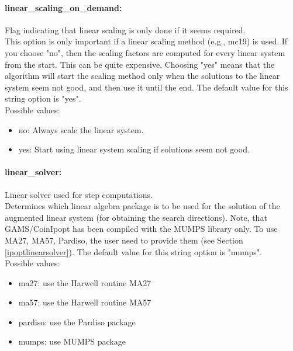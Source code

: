 \paragraph{linear\_scaling\_on\_demand:}\label{sec:linear_scaling_on_demand} Flag indicating that linear scaling is only done if it seems required. $\;$ \\
 This option is only important if a linear scaling
method (e.g., mc19) is used.  If you choose "no",
then the scaling factors are computed for every
linear system from the start.  This can be quite
expensive. Choosing "yes" means that the
algorithm will start the scaling method only when
the solutions to the linear system seem not good,
and then use it until the end.
The default value for this string option is "yes".
\\ 
Possible values:
\begin{itemize}
   \item no: Always scale the linear system.
   \item yes: Start using linear system scaling if solutions
seem not good.
\end{itemize}

\paragraph{linear\_solver:}\label{sec:linear_solver} Linear solver used for step computations. $\;$ \\
 Determines which linear algebra package is to be
used for the solution of the augmented linear
system (for obtaining the search directions).
Note, that GAMS/CoinIpopt has been compiled with the MUMPS library only.
To use MA27, MA57, Pardiso, the user need to provide them (see Section \ref{ipoptlinearsolver}).
The default value for this string option is "mumps".
\\ 
Possible values:
\begin{itemize}
   \item ma27: use the Harwell routine MA27
   \item ma57: use the Harwell routine MA57
   \item pardiso: use the Pardiso package
   \item mumps: use MUMPS package
\end{itemize}

